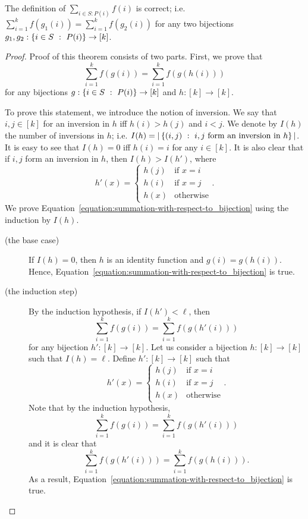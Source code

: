 \begin{theorem}
  The definition of $\sum_{i \in S : P(i)} f(i)$ is correct;
  i.e.
  $\sum_{i = 1}^k f(g_1(i)) = \sum_{i = 1}^k f(g_2(i))$
  for any two bijections $g_1, g_2 : \set[P(i)]{i \in S} \to [k]$.
\end{theorem}
\begin{proof}
  Proof of this theorem consists of two parts.
  First, we prove that
  \begin{equation}
    \label{equation:summation-with-respect-to_bijection}
    \sum_{i = 1}^k f(g(i)) = \sum_{i = 1}^k f(g(h(i)))
  \end{equation}
  for any bijections $g : \set[P(i)]{i \in S} \to [k]$ and $h : [k] \to [k]$.

  To prove this statement, we introduce the notion of inversion. We say that
  $i, j \in [k]$ for an inversion in $h$ iff $h(i) > h(j)$ and $i < j$.
  We denote by $I(h)$ the number of inversions in $h$; i.e. $I(h) =
  |\set[i, j \text{ form an inversion in } h]{(i, j)}|$. It is easy to see that
  $I(h) = 0$ iff $h(i) = i$ for any $i \in [k]$. It is also clear that if $i, j$
  form an inversion in $h$, then $I(h) > I(h')$, where
  \[
    h'(x) =
    \begin{cases}
      h(j) & \text{if } x = i \\
      h(i) & \text{if } x = j \\
      h(x) & \text{otherwise}
    \end{cases}.
  \]
  We prove Equation~\ref{equation:summation-with-respect-to_bijection} using the
  induction by $I(h)$.
  \begin{description}
    \item[(the base case)] If $I(h) = 0$, then $h$ is an identity function and
      $g(i) = g(h(i))$. Hence,
      Equation~\ref{equation:summation-with-respect-to_bijection} is true.
    \item[(the induction step)] By the induction hypothesis,
      if $I(h') < \ell$, then
      \[
        \sum_{i = 1}^k f(g(i)) = \sum_{i = 1}^k f(g(h'(i)))
      \]
      for any bijection $h' : [k] \to [k]$.
      Let us consider a bijection $h : [k] \to [k]$ such that $I(h) = \ell$.
      Define $h' : [k] \to [k]$ such that
      \[
        h'(x) =
        \begin{cases}
          h(j) & \text{if } x = i \\
          h(i) & \text{if } x = j \\
          h(x) & \text{otherwise}
        \end{cases}.
      \]
      Note that by the induction hypothesis,
      \[
        \sum_{i = 1}^k f(g(i)) = \sum_{i = 1}^k f(g(h'(i)))
      \]
      and it is clear that
      \[
        \sum_{i = 1}^k f(g(h'(i))) = \sum_{i = 1}^k f(g(h(i))).
      \]
      As a result,
      Equation~\ref{equation:summation-with-respect-to_bijection} is true.
  \end{description}


\end{proof}
